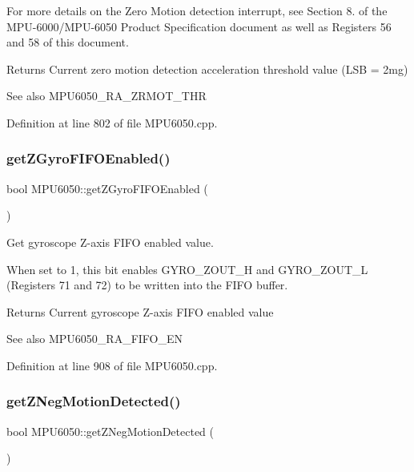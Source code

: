 For more details on the Zero Motion detection interrupt, see Section 8. of the M\+P\+U-\/6000/\+M\+P\+U-\/6050 Product Specification document as well as Registers 56 and 58 of this document.

\begin{DoxyReturn}{Returns}
Current zero motion detection acceleration threshold value (L\+SB = 2mg) 
\end{DoxyReturn}
\begin{DoxySeeAlso}{See also}
M\+P\+U6050\+\_\+\+R\+A\+\_\+\+Z\+R\+M\+O\+T\+\_\+\+T\+HR 
\end{DoxySeeAlso}


Definition at line 802 of file M\+P\+U6050.\+cpp.

\mbox{\label{classMPU6050_adbbbd131c74f37dd545403633eb317ff}} 
\subsubsection{\texorpdfstring{getZGyroFIFOEnabled()}{getZGyroFIFOEnabled()}}
{\footnotesize\ttfamily bool M\+P\+U6050\+::get\+Z\+Gyro\+F\+I\+F\+O\+Enabled (\begin{DoxyParamCaption}{ }\end{DoxyParamCaption})}



Get gyroscope Z-\/axis F\+I\+FO enabled value. 

When set to 1, this bit enables G\+Y\+R\+O\+\_\+\+Z\+O\+U\+T\+\_\+H and G\+Y\+R\+O\+\_\+\+Z\+O\+U\+T\+\_\+L (Registers 71 and 72) to be written into the F\+I\+FO buffer. \begin{DoxyReturn}{Returns}
Current gyroscope Z-\/axis F\+I\+FO enabled value 
\end{DoxyReturn}
\begin{DoxySeeAlso}{See also}
M\+P\+U6050\+\_\+\+R\+A\+\_\+\+F\+I\+F\+O\+\_\+\+EN 
\end{DoxySeeAlso}


Definition at line 908 of file M\+P\+U6050.\+cpp.

\mbox{\label{classMPU6050_a3601b732eb15644212b8f29cf396e142}} 
\subsubsection{\texorpdfstring{getZNegMotionDetected()}{getZNegMotionDetected()}}
{\footnotesize\ttfamily bool M\+P\+U6050\+::get\+Z\+Neg\+Motion\+Detected (\begin{DoxyParamCaption}{ }\end{DoxyParamCaption})}



